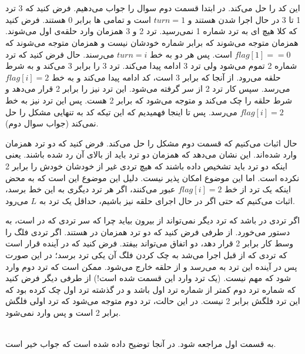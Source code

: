 \\
\\\noindent
این کد
را حل می‌کند.
در ابتدا قسمت دوم سوال را جواب
می‌دهیم. فرض کنید که 3 ترد 1 تا 3 در حال اجرا شدن هستند و
$turn = 1$
است و تمامی
ها
برابر 0 هستند.
فرض کنید که کلا هیچ
ای
به ترد شماره 1 نمی‌رسید.
ترد 2 و 3 همزمان وارد حلقه‌ی اول
می‌شوند. همزمان متوجه می‌شوند که
برابر شماره خودشان نیست و همزمان متوجه می‌شوند که
$flag[1] == 0$
است. پس هر دو به خط
$turn = i$
می‌رسند. حال فرض کنید که
ترد شماره 2 تموم می‌شود ولی ترد 3 ادامه پیدا می‌کند. ترد 3
را برابر 3 می‌کند و به شرط حلقه می‌رود. از آنجا که
برابر 3 است، کد ادامه پیدا می‌کند و به خط
$flag[i] = 2$
می‌رسد. سپس کار ترد 2 از سر گرفته می‌شود. این ترد نیز
را برابر 2 قرار می‌دهد و شرط حلقه را چک می‌کند و متوجه می‌شود که برابر 2 هست. پس این ترد نیز به خط
$flag[i] = 2$
می‌رسد. پس تا اینجا فهمیدیم که این تیکه کد به تنهایی مشکل
را حل نمی‌کند (جواب سوال دوم).

\noindent
حال اثبات می‌کنیم که قسمت دوم مشکل را حل می‌کند. فرض کنید که دو ترد همزمان وارد
شده‌اند. این نشان می‌دهد که همزمان دو ترد باید از
بالای آن رد شده باشند. یعنی اینکه دو ترد باید تشخیص داده باشند که هیچ تردی غیر از خودشان
خودش را برابر 2 نکرده است. اما این موضوع امکان پذیر نیست. دلیل این موضوع این است که به محض اینکه
یک ترد از خط
$flag[i] = 2$
عبور می‌کنند، اگر هر ترد دیگری به این خط برسد، اثبات می‌کنیم که حتی اگر در حال اجرای حلقه نیز باشیم،
حداقل یک ترد به
$L$
می‌رود.

\noindent
اگر تردی در
باشد که ترد دیگر نمی‌تواند از
بیرون بیاید چرا که سر تردی که در
است، به دستور
می‌خورد. از طرفی فرض کنید که دو ترد همزمان در
هستند. اگر تردی فلگ را وسط کار برابر 2 قرار دهد، دو اتفاق می‌تواند بیفتد. فرض کنید که در آینده قرار است
که تردی که از قبل اجرا می‌شد به چک کردن فلگ آن یکی ترد برسد؛ در این صورت پس در آینده این ترد به
می‌رسد و از حلقه خارج می‌شود. ممکن است که ترد دوم وارد
شود که مهم نیست. (یک ترد وارد این قسمت شده است!)
از طرفی دیگر فرض کنید که شماره ترد دوم کمتر از شماره ترد اول باشد و در گذشته ترد اول
چک کرده بود که این ترد فلگش برابر 2 نیست. در این حالت، ترد دوم متوجه می‌شود که ترد اولی
فلگش برابر 2 است و پس وارد
نمی‌شود.

\\\noindent
به قسمت اول مراجعه شود. در آنجا توضیح داده شده است که جواب خیر است.

